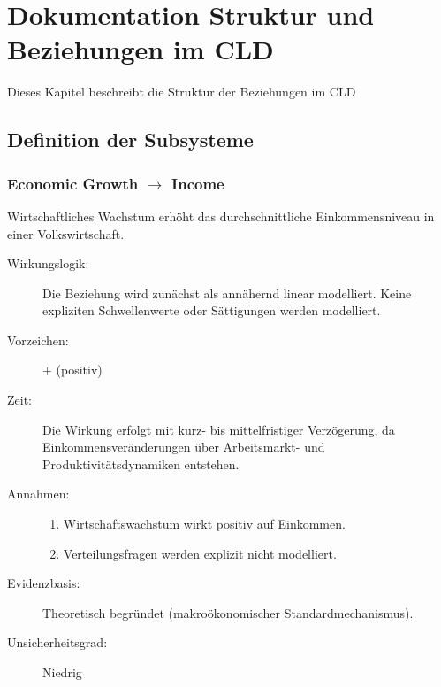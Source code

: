 \chapter{Dokumentation Struktur und Beziehungen im CLD}
\label{ch:dokumentation_struktur}

Dieses Kapitel beschreibt die Struktur der Beziehungen im CLD 

\section*{Definition der Subsysteme}
\label{sec:subsysteme}

\subsection{Economic Growth $\rightarrow$ Income}
\label{subsec:growth_income}

Wirtschaftliches Wachstum erhöht das durchschnittliche Einkommensniveau in einer Volkswirtschaft. 

\begin{description}
    \item[Wirkungslogik:] Die Beziehung wird zunächst als annähernd linear modelliert. Keine expliziten Schwellenwerte oder Sättigungen werden modelliert.
    \item[Vorzeichen:] $+$ (positiv)
    \item[Zeit:] Die Wirkung erfolgt mit kurz- bis mittelfristiger Verzögerung, da Einkommensveränderungen über Arbeitsmarkt- und Produktivitätsdynamiken entstehen.
    \item[Annahmen:] \vspace{-0.5em} %
    \begin{enumerate}
        \item Wirtschaftswachstum wirkt positiv auf Einkommen. 
        \item Verteilungsfragen werden explizit nicht modelliert.
    \end{enumerate}
    \item[Evidenzbasis:] Theoretisch begründet (makroökonomischer Standardmechanismus).
    \item[Unsicherheitsgrad:] Niedrig
\end{description}

